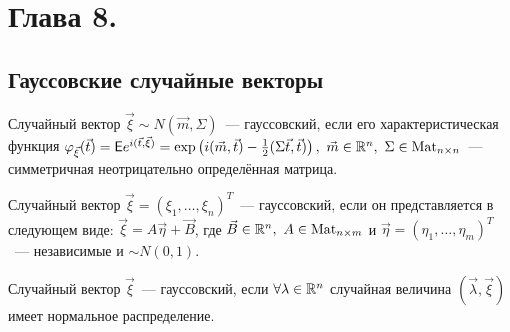 \section{Глава 8.}
\subsection{Гауссовские случайные векторы}
	\begin{definition}[1]
		Случайный вектор $\vec{\xi} \sim N(\vec{m}, \Sigma)$~--- гауссовский, если его характеристическая функция $\varphi_{\vec{\xi}}(\vec{t}) = \mathsf{E} e^{i(\vec{t},\vec{\xi})} = \exp\left(i(\vec{m}, \vec{t}) - \frac{1}{2}(\Sigma \vec{t}, \vec{t})\right), ~ \vec{m} \in \mathbb{R}^n, ~\Sigma \in \operatorname{Mat}_{n \times n}$~--- симметричная неотрицательно определённая матрица.
	\end{definition}

	\begin{definition}[2]
		Случайный вектор $\vec{\xi}  = (\xi_1, \dots, \xi_n)^T$~--- гауссовский, если он представляется в следующем виде: $\vec{\xi} = A\vec{\eta} + \vec{B}$, где $\vec{B} \in \mathbb{R}^n, ~A\in \operatorname{Mat}_{n\times m}$ и $\vec{\eta} = (\eta_1, \ldots, \eta_m)^T$~--- независимые и $\sim N(0, 1)$.
	\end{definition}

	\begin{definition}[3]
		Случайный вектор $\vec{\xi}$~--- гауссовский, если \(\forall \lambda \in \mathbb{R}^n\) случайная величина \((\vec{\lambda}, \vec{\xi})\) имеет нормальное распределение.
	\end{definition}

